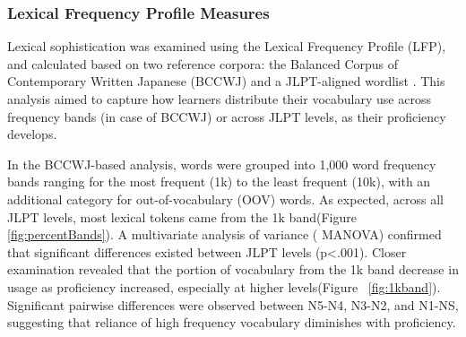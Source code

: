 \subsubsection{Lexical Frequency Profile Measures}
Lexical sophistication was examined using the Lexical Frequency Profile (LFP), and calculated based on two
reference corpora: the
Balanced Corpus of
Contemporary Written Japanese (BCCWJ) \citep{maekawa2014} and a JLPT-aligned wordlist \citep{jisho.org}. This
analysis aimed to capture how learners distribute their vocabulary use across frequency bands (in case of BCCWJ) or
across JLPT levels,
as their proficiency develops.




In the BCCWJ-based analysis, words were grouped into 1,000 word frequency bands ranging for the most frequent (1k)
to the
least frequent (10k), with an additional category for out-of-vocabulary (OOV) words. As expected, across all JLPT
levels, most lexical tokens came from the 1k band(Figure~
\ref{fig:percentBands}). A multivariate analysis of variance (
MANOVA)
confirmed that significant differences existed between JLPT levels (p<.001). Closer examination revealed that the
portion of vocabulary from the 1k band decrease in usage as proficiency increased, especially at higher levels(Figure~
\ref{fig:1kband}). Significant pairwise differences were observed between N5-N4, N3-N2, and N1-NS, suggesting that
reliance of high frequency vocabulary diminishes with proficiency.


